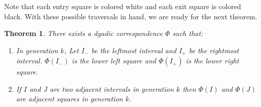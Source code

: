 \documentclass[letterpaper,12pt,fleqn,reqno]{amsart}
\theoremstyle{plain}
\newtheorem{thm}{Theorem}[section]
\begin{document}
Note that each entry square is colored white and each exit square is colored
black. With these possible traversals in hand, we are ready for the next
theorem.

\begin{thm}
There exists a dyadic correspondence $\Phi$ such that:
\begin{enumerate}
\item\label{thm:check} In generation $k$, Let $I_{-}$ be the leftmost interval
and $I_{+}$ be the rightmost interval. $\Phi(I_{-})$ is the lower left square
and $\Phi(I_{+})$ is the lower right square.

\item\label{thm:ind} If $I$ and $J$ are two adjacent intervals in generation
$k$ then $\Phi(I)$ and $\Phi(J)$ are adjacent squares in generation $k$.
\end{enumerate}
\end{thm}
\end{document}
